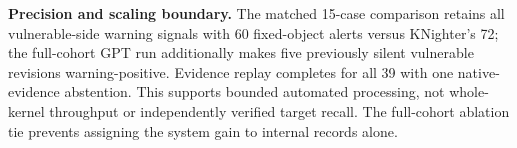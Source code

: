 \noindent\textbf{Precision and scaling boundary.}\quad
The matched 15-case comparison retains all vulnerable-side warning signals with 60 fixed-object alerts versus KNighter's 72; the full-cohort GPT run additionally makes five previously silent vulnerable revisions warning-positive. Evidence replay completes for all 39 with one native-evidence abstention. This supports bounded automated processing, not whole-kernel throughput or independently verified target recall. The full-cohort ablation tie prevents assigning the system gain to internal records alone.
